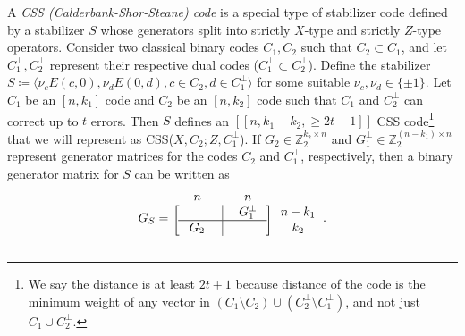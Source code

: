 \documentclass[twoside,romanappendices]{IEEEtran}
\newcommand{\llbr}{[\![}
\newcommand{\rrbr}{]\!]}
\begin{document}
A \emph{CSS (Calderbank-Shor-Steane) code} is a special type of stabilizer code defined by a stabilizer $S$ whose generators split into strictly $X$-type and strictly $Z$-type operators.
Consider two classical binary codes $C_1,C_2$ such that $C_2 \subset C_1$, and let $C_1^{\perp}, C_2^{\perp}$ represent their respective dual codes ($C_1^{\perp} \subset C_2^{\perp}$).
Define the stabilizer $S \coloneqq \langle \nu_c E(c,0), \nu_d E(0,d), c \in C_2, d \in C_1^{\perp} \rangle$ for some suitable $\nu_c, \nu_d \in \{ \pm 1 \}$.
Let $C_1$ be an $[n,k_1]$ code and $C_2$ be an $[n,k_2]$ code such that $C_1$ and $C_2^{\perp}$ can correct up to $t$ errors.
Then $S$ defines an $\llbr n, k_1-k_2, \geq 2t+1 \rrbr$ CSS code\footnote{We say the distance is at least $2t+1$ because distance of the code is the minimum weight of any vector in $(C_1 \setminus C_2) \cup (C_2^{\perp} \setminus C_1^{\perp})$, and not just $C_1 \cup C_2^{\perp}$.} that we will represent as CSS($X,C_2 ; Z, C_1^{\perp}$).
If $G_2 \in \mathbb{Z}_2^{k_2 \times n}$ and $G_1^{\perp} \in \mathbb{Z}_2^{(n-k_1) \times n}$ represent generator matrices for the codes $C_2$ and $C_1^{\perp}$, respectively, then a binary generator matrix for $S$ can be written as
\begin{align}
\setlength\aboverulesep{0pt}\setlength\belowrulesep{0pt}
    \setlength\cmidrulewidth{0.5pt}
G_S = 
\begin{blockarray}{ccc}
 n & n &   \\
\begin{block}{[c|c]c}
\hspace*{1cm} & G_1^{\perp} & n - k_1 \\
\cmidrule(lr){1-2}
G_2 & \hspace*{1cm} & k_2 \\
\end{block}
\end{blockarray}.
\end{align}
\end{document}
